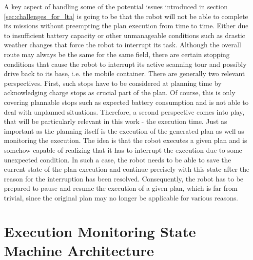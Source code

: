 \documentclass[english, master, utf8]{base/thesis_KBS}
\begin{document}
A key aspect of handling some of the potential issues introduced in section \ref{sec:challenges_for_lta} is going to be that the robot will not be able to
complete its missions without preempting the plan execution from time to time. Either due to insufficient battery capacity or other unmanageable conditions such as 
drastic weather changes that force the robot to interrupt its task. Although the overall route may always be the same for the same field, there are certain stopping
conditions that cause the robot to interrupt its active scanning tour and possibly drive back to its base, i.e. the mobile container.
There are generally two relevant perspectives. First, such stops have to be considered at planning time by acknowledging charge stops as crucial part of the plan.
Of course, this is only covering plannable stops such as expected battery consumption and is not able to deal with unplanned situations.
Therefore, a second perspective comes into play, that will be particularly relevant in this work - the execution time.
Just as important as the planning itself is the execution of the generated plan as well as monitoring the execution.
The idea is that the robot executes a given plan and is somehow capable of realizing that it has to interrupt the execution due to some unexpected condition.
In such a case, the robot needs to be able to save the current state of the plan execution and continue precisely with this state after the reason 
for the interruption has been resolved. Consequently, the robot has to be prepared to pause and resume the execution of a given plan, which is far from 
trivial, since the original plan may no longer be applicable for various reasons.

\section{Execution Monitoring State Machine Architecture}
\label{sec:execution_monitoring_smach_architecture}
\end{document}
